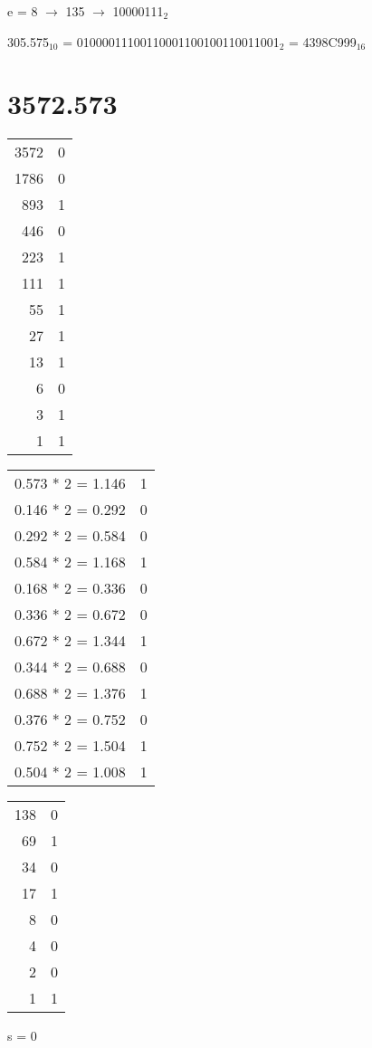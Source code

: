 \documentclass{article}
\begin{document}
e = 8 $\rightarrow$ 135 $\rightarrow$ 10000111$_2$

305.575$_{10}$ = 01000011100110001100100110011001$_2$ = 4398C999$_{16}$\pagebreak

\section{3572.573}\begin{multicols}{3}\begin{center}
\begin{tabular}{r | l}
3572&0\\
1786&0\\
893&1\\
446&0\\
223&1\\
111&1\\
55&1\\
27&1\\
13&1\\
6&0\\
3&1\\
1&1\\
\end{tabular}

\begin{tabular}{r | l}
0.573 * 2 = 1.146&1\\
0.146 * 2 = 0.292&0\\
0.292 * 2 = 0.584&0\\
0.584 * 2 = 1.168&1\\
0.168 * 2 = 0.336&0\\
0.336 * 2 = 0.672&0\\
0.672 * 2 = 1.344&1\\
0.344 * 2 = 0.688&0\\
0.688 * 2 = 1.376&1\\
0.376 * 2 = 0.752&0\\
0.752 * 2 = 1.504&1\\
0.504 * 2 = 1.008&1\\
\end{tabular}

\begin{tabular}{r | l}
138&0\\
69&1\\
34&0\\
17&1\\
8&0\\
4&0\\
2&0\\
1&1\\
\end{tabular}
\end{center}\end{multicols}
s = 0
\end{document}

